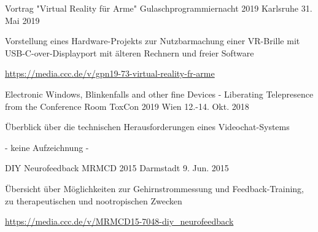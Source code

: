
\begin{cventries}
  \cventry
    { Vortrag "Virtual Reality für Arme" } %
    {Gulaschprogrammiernacht 2019} %
    {Karlsruhe} %
    {31. Mai 2019} %
    {
      \begin{cvitems} %
        \item {Vorstellung eines Hardware-Projekts zur Nutzbarmachung einer VR-Brille mit USB-C-over-Displayport mit älteren Rechnern und freier Software}
        \item {\href{https://media.ccc.de/v/gpn19-73-virtual-reality-fr-arme }{https://media.ccc.de/v/gpn19-73-virtual-reality-fr-arme } }
      \end{cvitems}
    }
  \cventry
    { Electronic Windows, Blinkenfalls and other fine Devices - Liberating Telepresence from the Conference Room } %
    {ToxCon 2019} %
    {Wien} %
    {12.-14. Okt. 2018} %
    {
      \begin{cvitems} %
        \item { Überblick über die technischen Herausforderungen eines Videochat-Systems }
        \item { - keine Aufzeichnung - }
      \end{cvitems}
    }


  \cventry
    { DIY Neurofeedback } %
    {MRMCD 2015} %
    {Darmstadt} %
    {9. Jun. 2015} %
    {
      \begin{cvitems} %
        \item {Übersicht über Möglichkeiten zur Gehirnstrommessung und Feedback-Training, zu therapeutischen und nootropischen Zwecken}
        \item {\href{https://media.ccc.de/v/MRMCD15-7048-diy\_neurofeedback }{https://media.ccc.de/v/MRMCD15-7048-diy\_neurofeedback } }
      \end{cvitems}
    }

\end{cventries}
